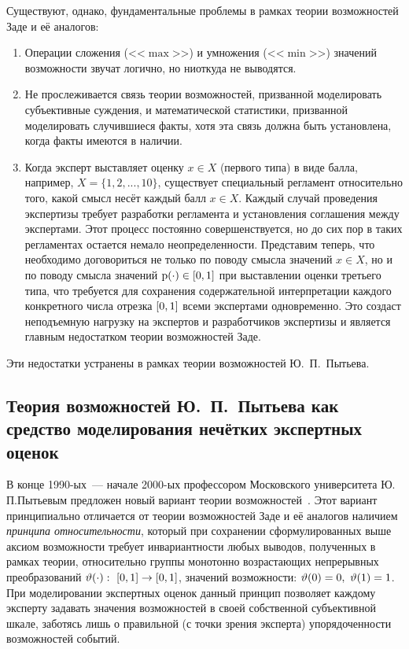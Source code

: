 Существуют, однако, фундаментальные проблемы в рамках теории возможностей Заде и её аналогов:
\begin{enumerate}
\item
Операции сложения (<<$\max$>>) и умножения (<<$\min$>>) значений возможности звучат логично, но ниоткуда не выводятся.
\item
Не прослеживается связь теории возможностей, призванной моделировать субъективные суждения, и математической статистики, призванной моделировать случившиеся факты, хотя эта связь должна быть установлена, когда факты имеются в наличии.
\item
Когда эксперт выставляет оценку $x \in X$ (первого типа) в виде балла, например, $X = \{1, 2, ..., 10\}$, существует специальный регламент относительно того, какой смысл несёт каждый балл $x \in X$. Каждый случай проведения экспертизы требует разработки регламента и установления соглашения между экспертами. Этот процесс постоянно совершенствуется, но до сих пор в таких регламентах остается немало неопределенности. Представим теперь, что необходимо договориться не только по поводу смысла значений $x \in X$, но и по поводу смысла значений ${\mathrm{p}}(\cdot) \in [0,1]$ при выставлении оценки третьего типа, что требуется для сохранения содержательной интерпретации каждого конкретного числа отрезка $[0,1]$ всеми экспертами одновременно. Это создаст неподъемную нагрузку на экспертов и разработчиков экспертизы и является главным недостатком теории возможностей Заде. 
\end{enumerate}
Эти недостатки устранены в рамках теории возможностей Ю.~П.~Пытьева.

\subsection{Теория возможностей Ю.~П.~Пытьева как средство моделирования нечётких экспертных оценок}
\label{sec:math_methods_ours}

В конце 1990-ых~--- начале 2000-ых профессором Московского университета Ю.\,П.\;Пытьевым предложен новый вариант теории возможностей~\cite{possbook, cit:smf, possbook2, probbook, pytyev_experts}. Этот вариант принципиально отличается от теории возможностей Заде и её аналогов наличием \emph{принципа относительности}, который при сохранении сформулированных выше аксиом возможности требует инвариантности любых выводов, полученных в рамках теории, относительно группы монотонно возрастающих непрерывных преобразований $\vartheta(\cdot):\ [0,1]\to[0,1]$, значений возможности: $\vartheta(0) = 0,\ \vartheta(1) = 1$. При моделировании экспертных оценок данный принцип позволяет каждому эксперту задавать значения возможностей в своей собственной субъективной шкале, заботясь лишь о правильной (с точки зрения эксперта) упорядоченности возможностей событий.

